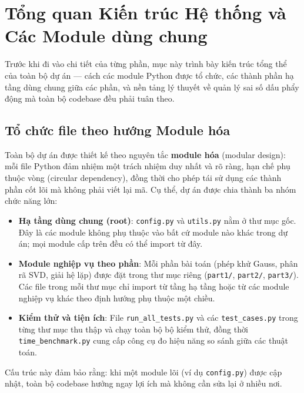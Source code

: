 \section{Tổng quan Kiến trúc Hệ thống và Các Module dùng chung}

Trước khi đi vào chi tiết của từng phần, mục này trình bày kiến trúc tổng thể của toàn bộ dự án --- cách các module Python được tổ chức, các thành phần hạ tầng dùng chung giữa các phần, và nền tảng lý thuyết về quản lý sai số dấu phẩy động mà toàn bộ codebase đều phải tuân theo.

\subsection{Tổ chức file theo hướng Module hóa}

Toàn bộ dự án được thiết kế theo nguyên tắc \textbf{module hóa} (modular design): mỗi file Python đảm nhiệm một trách nhiệm duy nhất và rõ ràng, hạn chế phụ thuộc vòng (circular dependency), đồng thời cho phép tái sử dụng các thành phần cốt lõi mà không phải viết lại mã. Cụ thể, dự án được chia thành ba nhóm chức năng lớn:

\begin{itemize}
    \item \textbf{Hạ tầng dùng chung (root)}: \texttt{config.py} và \texttt{utils.py} nằm ở thư mục gốc. Đây là các module không phụ thuộc vào bất cứ module nào khác trong dự án; mọi module cấp trên đều có thể import từ đây.
    \item \textbf{Module nghiệp vụ theo phần}: Mỗi phần bài toán (phép khử Gauss, phân rã SVD, giải hệ lặp) được đặt trong thư mục riêng (\texttt{part1/}, \texttt{part2/}, \texttt{part3/}). Các file trong mỗi thư mục chỉ import từ tầng hạ tầng hoặc từ các module nghiệp vụ khác theo định hướng phụ thuộc một chiều.
    \item \textbf{Kiểm thử và tiện ích}: File \texttt{run\_all\_tests.py} và các \texttt{test\_cases.py} trong từng thư mục thu thập và chạy toàn bộ bộ kiểm thử, đồng thời \texttt{time\_benchmark.py} cung cấp công cụ đo hiệu năng so sánh giữa các thuật toán.
\end{itemize}

Cấu trúc này đảm bảo rằng: khi một module lõi (ví dụ \texttt{config.py}) được cập nhật, toàn bộ codebase hưởng ngay lợi ích mà không cần sửa lại ở nhiều nơi.

